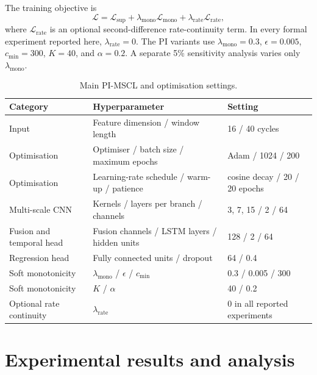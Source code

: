 \documentclass[pdflatex,sn-mathphys-num]{sn-jnl}
\begin{document}
The training objective is
\begin{equation}
\mathcal{L}=\mathcal{L}_{\mathrm{sup}}+\lambda_{\mathrm{mono}}\mathcal{L}_{\mathrm{mono}}+\lambda_{\mathrm{rate}}\mathcal{L}_{\mathrm{rate}},
\label{eq:total_loss}
\end{equation}
where $\mathcal{L}_{\mathrm{rate}}$ is an optional second-difference rate-continuity term. In every formal experiment reported here, $\lambda_{\mathrm{rate}}=0$. The PI variants use $\lambda_{\mathrm{mono}}=0.3$, $\epsilon=0.005$, $c_{\min}=300$, $K=40$, and $\alpha=0.2$. A separate 5\% sensitivity analysis varies only $\lambda_{\mathrm{mono}}$.

\begin{table}[t]
\caption{Main PI-MSCL and optimisation settings.}
\label{tab:hyperparameters}
\centering
\small
\begin{tabular}{@{}p{}p{}p{}@{}}
\toprule
Category & Hyperparameter & Setting \\
\midrule
Input & Feature dimension / window length & 16 / 40 cycles \\
Optimisation & Optimiser / batch size / maximum epochs & Adam / 1024 / 200 \\
Optimisation & Learning-rate schedule / warm-up / patience & cosine decay / 20 / 20 epochs \\
Multi-scale CNN & Kernels / layers per branch / channels & 3, 7, 15 / 2 / 64 \\
Fusion and temporal head & Fusion channels / LSTM layers / hidden units & 128 / 2 / 64 \\
Regression head & Fully connected units / dropout & 64 / 0.4 \\
Soft monotonicity & $\lambda_{\mathrm{mono}}$ / $\epsilon$ / $c_{\min}$ & 0.3 / 0.005 / 300 \\
Soft monotonicity & $K$ / $\alpha$ & 40 / 0.2 \\
Optional rate continuity & $\lambda_{\mathrm{rate}}$ & 0 in all reported experiments \\
\bottomrule
\end{tabular}
\end{table}

\section{Experimental results and analysis}
\label{sec:results}


\end{document}
